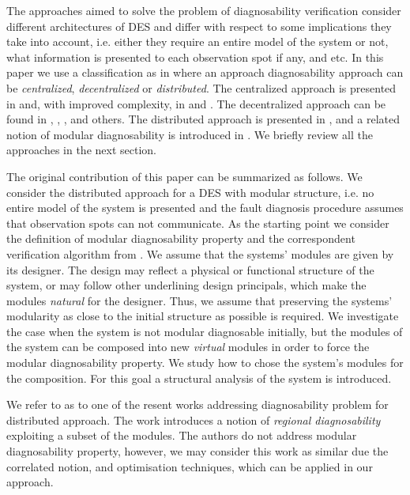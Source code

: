 \documentclass[letterpaper, 10pt, conference]{ieeeconf}
\begin{document}
The approaches aimed to solve the problem of diagnosability verification
consider different architectures of DES and differ with respect to some
implications they take into account, i.e. either they require an entire model of
the system or not, what information is presented to each observation spot if any,
and etc. In this paper we use a classification as in \cite{su_global_2005} where
an approach diagnosability approach can be \emph{centralized},
\emph{decentralized} or \emph{distributed}. The centralized approach is
presented in \cite{sampath_diagnosability_1995} and, with improved complexity,
in \cite{jiang_polynomial_2001} and \cite{yoo_polynomial-time_2002}.
The decentralized approach can be found in \cite{debouk_coordinated_1998},
\cite{pencole_formal_2005}, \cite{qiu_decentralized_2006},
\cite{wang_diagnosis_2007} and others.
The distributed approach is presented in \cite{su_distributed_2002}, and a
related notion of modular diagnosability is introduced in
\cite{contant_diagnosability_2006}. We briefly review all the approaches in the
next section.

The original contribution of this paper can be summarized as follows. We
consider the distributed approach for a DES with modular structure, i.e. no
entire model of the system is presented and the fault diagnosis procedure
assumes that observation spots can not communicate. As the starting point we
consider the definition of modular diagnosability property and the correspondent
verification algorithm from \cite{contant_diagnosability_2006}. We assume that
the systems' modules are given by its designer. The design may reflect a
physical or functional structure of the system, or may follow other underlining
design principals, which make the modules \emph{natural} for the designer.
Thus, we assume that preserving the systems' modularity as close to the initial
structure as possible is required. We investigate the case when the system is
not modular diagnosable initially, but the modules of the system can be composed
into new \emph{virtual} modules in order to force the modular diagnosability
property. We study how to chose the system's modules for the composition. For
this goal a structural analysis of the system is introduced. 

We refer to \cite{ye_optimized_2010} as to one of the resent works addressing
diagnosability problem for distributed approach. The work introduces a notion of
\emph{regional diagnosability} exploiting a subset of the modules. The authors
do not address modular diagnosability property, however, we may consider this
work as similar due the correlated notion, and optimisation techniques, which
can be applied in our approach.
\end{document}
